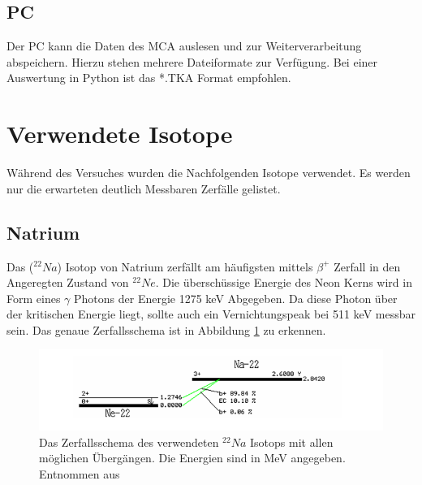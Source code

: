 \subsection{PC}
Der PC kann die Daten des MCA auslesen und zur Weiterverarbeitung abspeichern. Hierzu stehen mehrere Dateiformate zur Verfügung. Bei einer Auswertung in Python ist das *.TKA Format empfohlen. 

\section{Verwendete Isotope}
Während des Versuches wurden die Nachfolgenden Isotope verwendet. Es werden nur die erwarteten deutlich Messbaren Zerfälle gelistet.
\subsection{Natrium}
Das ($^{22}Na$) Isotop von Natrium zerfällt am häufigsten mittels $\beta^+$  Zerfall in den Angeregten Zustand von $^{22}Ne$. Die überschüssige Energie des Neon Kerns wird in Form eines $\gamma$ Photons der Energie 1275 keV Abgegeben. Da diese Photon über der kritischen Energie liegt, sollte auch ein Vernichtungspeak bei 511 keV messbar sein. Das genaue Zerfallsschema ist in Abbildung \ref{Natrium_schema} zu erkennen.

\begin{figure}
	\centering
	\includegraphics[scale=0.8]{Bilder/Natrium_zerfall}
	\caption[Zerfallsschema Natrium]{\small Das Zerfallsschema des verwendeten $^{22}Na$ Isotops mit allen möglichen Übergängen. Die Energien sind in MeV angegeben. Entnommen aus \cite{staatsex_szinti}}
	\label{Natrium_schema}
\end{figure}

